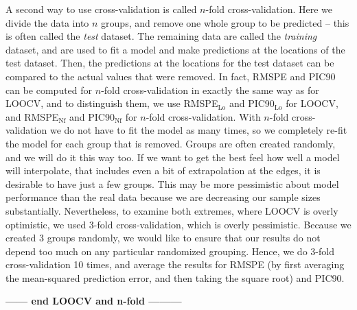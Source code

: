 \documentclass[12pt, titlepage]{article}
\begin{document}
A second way to use cross-validation is called $n$-fold cross-validation.  Here we divide the data into $n$ groups, and remove one whole group to be predicted -- this is often called the \textit{test} dataset.  The remaining data are called the \textit{training} dataset, and are used to fit a model and make predictions at the locations of the test dataset.  Then, the predictions at the locations for the test dataset can be compared to the actual values that were removed.  In fact, RMSPE and PIC90 can be computed for $n$-fold cross-validation in exactly the same way as for LOOCV, and to distinguish them, we use RMSPE$_{\textrm{Lo}}$ and PIC90$_{\textrm{Lo}}$ for LOOCV, and RMSPE$_{\textrm{Nf}}$ and PIC90$_{\textrm{Nf}}$ for $n$-fold cross-validation. With $n$-fold cross-validation we do not have to fit the model as many times, so we completely re-fit the model for each group that is removed.  Groups are often created randomly, and we will do it this way too.  If we want to get the best feel how well a model will interpolate, that includes even a bit of extrapolation at the edges, it is desirable to have just a few groups.  This may be more pessimistic about model performance than the real data because we are decreasing our sample sizes substantially.  Nevertheless, to examine both extremes, where LOOCV is overly optimistic, we used 3-fold cross-validation, which is overly pessimistic.  Because we created 3 groups randomly, we would like to ensure that our results do not depend too much on any particular randomized grouping.  Hence, we do 3-fold cross-validation 10 times, and average the results for RMSPE (by first averaging the mean-squared prediction error, and then taking the square root) and PIC90.

{\large \center \textbf{ ------ end LOOCV and n-fold ---------}}
\vspace{.3cm}
\end{document}
